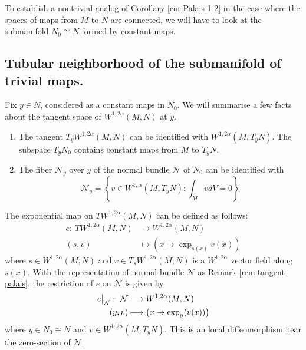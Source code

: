 To establish a nontrivial analog of Corollary \ref{cor:Palais-1-2} in the case where the
spaces of maps from \(M\) to \(N\) are connected, we will have to look at the
submanifold \(N_0\cong N\) formed by constant maps.

\subsection{Tubular neighborhood of the submanifold of trivial maps.}
\label{sec:org8969f45}

Fix \(y\in N\), considered as a constant maps in \(N_0\). We will summarise a few facts about the tangent space of \(W^{1,2\alpha}(M,N)\) at \(y\).

\begin{remark}
\label{rem:tangent-palais}
\begin{enumerate}
\item The tangent \(T_y W^{1, 2\alpha}(M,N)\) can be identified with \(W^{1,2\alpha}(M, T_y
   N)\). The subspace \(T_y N_0\) contains constant maps from \(M\) to \(T_y N\).
\item The fiber \(\mathcal{N}_y\) over \(y\) of the normal bundle \(\mathcal{N}\) of \(N_0\) can be identified with
\[
    \mathcal{N}_y = \left\{v\in W^{1,\alpha}(M, T_y N): \int_M v dV = 0\right\}
   \]
\end{enumerate}
\end{remark}

The exponential map on \(TW^{1,2\alpha}(M,N)\) can be defined as follows:
\begin{align*}
  e:\ TW^{1,2\alpha}(M,N) & \longrightarrow W^{1,2\alpha}(M,N)\\
  (s,v) 		  &\longmapsto \left(x\mapsto \exp_{s(x)}v(x) \right)
\end{align*}
where \(s\in W^{1,2\alpha}(M,N)\) and \(v\in T_s W^{1,2\alpha}(M,N)\) is a \(W^{1,2\alpha}\) vector field along \(s(x)\). With the representation of normal bundle
\(\mathcal{N}\) as Remark \ref{rem:tangent-palais}, the restriction of \(e\) on \(\mathcal{N}\) is given by
\begin{align*}
\restr{e}{\mathcal{N}}:\ \mathcal{N} &\longrightarrow  W^{1,2\alpha}(M,N)\\
			 (y,v) &\longmapsto	       \left(x\mapsto \exp_y (v(x)) \right)
\end{align*}
where \(y\in N_0 \cong N\) and \(v \in W^{1,2\alpha}(M, T_yN)\). This is an local
diffeomorphism near the zero-section of \(\mathcal{N}\).

